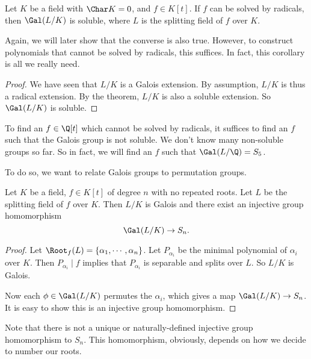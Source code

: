 \documentclass[a4paper]{article}
\begin{document}
\begin{cor}
  Let $K$ be a field with $\Char K = 0$, and $f \in K[t]$. If $f$ can be solved by radicals, then $\Gal(L/K)$ is soluble, where $L$ is the splitting field of $f$ over $K$.
\end{cor}
Again, we will later show that the converse is also true. However, to construct polynomials that cannot be solved by radicals, this suffices. In fact, this corollary is all we really need.

\begin{proof}
  We have seen that $L/K$ is a Galois extension. By assumption, $L/K$ is thus a radical extension. By the theorem, $L/K$ is also a soluble extension. So $\Gal(L/K)$ is soluble.
\end{proof}

To find an $f \in \Q[t]$ which cannot be solved by radicals, it suffices to find an $f$ such that the Galois group is not soluble. We don't know many non-soluble groups so far. So in fact, we will find an $f$ such that $\Gal(L/\Q) = S_5$.

To do so, we want to relate Galois groups to permutation groups.
\begin{lemma}
  Let $K$ be a field, $f \in K[t]$ of degree $n$ with no repeated roots. Let $L$ be the splitting field of $f$ over $K$. Then $L/K$ is Galois and there exist an injective group homomorphism
  \[
    \Gal(L/K) \to S_n.
  \]
\end{lemma}

\begin{proof}
  Let $\Root_f(L) = \{\alpha_1, \cdots, \alpha_n\}$. Let $P_{\alpha_i}$ be the minimal polynomial of $\alpha_i$ over $K$. Then $P_{\alpha_i} \mid f$ implies that $P_{\alpha_i}$ is separable and splits over $L$. So $L/K$ is Galois.

  Now each $\phi \in \Gal(L/K)$ permutes the $\alpha_i$, which gives a map $\Gal(L/K) \to S_n$. It is easy to show this is an injective group homomorphism.
\end{proof}
Note that there is not a unique or naturally-defined injective group homomorphism to $S_n$. This homomorphism, obviously, depends on how we decide to number our roots.
\end{document}
